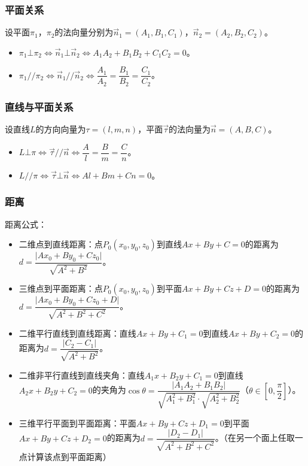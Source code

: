\subsubsection{平面关系}

设平面$\pi_1$，$\pi_2$的法向量分别为$\vec{n}_1=(A_1,B_1,C_1)$，$\vec{n}_2=(A_2,B_2,C_2)$。

\begin{itemize}
    \item $\pi_1\bot\pi_2\Leftrightarrow\vec{n}_1\bot\vec{n}_2\Leftrightarrow A_1A_2+B_1B_2+C_1C_2=0$。
    \item $\pi_1//\pi_2\Leftrightarrow\vec{n}_1//\vec{n}_2\Leftrightarrow\dfrac{A_1}{A_2}=\dfrac{B_1}{B_2}=\dfrac{C_1}{C_2}$。
\end{itemize}

\subsubsection{直线与平面关系}

设直线$L$的方向向量为$\tau=(l,m,n)$，平面$\vec{\tau}$的法向量为$\vec{n}=(A,B,C)$。

\begin{itemize}
    \item $L\bot\pi\Leftrightarrow\vec{\tau}//\vec{n}\Leftrightarrow\dfrac{A}{l}=\dfrac{B}{m}=\dfrac{C}{n}$。
    \item $L//\pi\Leftrightarrow\vec{\tau}\bot\vec{n}\Leftrightarrow Al+Bm+Cn=0$。
\end{itemize}

\subsubsection{距离}

距离公式：

\begin{itemize}
    \item 二维点到直线距离：点$P_0(x_0,y_0,z_0)$到直线$Ax+By+C=0$的距离为$d=\dfrac{\vert Ax_0+By_0+Cz_0\vert}{\sqrt{A^2+B^2}}$。
    \item 三维点到平面距离：点$P_0(x_0,y_0,z_0)$到平面$Ax+By+Cz+D=0$的距离为$d=\dfrac{\vert Ax_0+By_0+Cz_0+D\vert}{\sqrt{A^2+B^2+C^2}}$。
    \item 二维平行直线到直线距离：直线$Ax+By+C_1=0$到直线$Ax+By+C_2=0$的距离为$d=\dfrac{\vert C_2-C_1\vert}{\sqrt{A^2+B^2}}$。
    \item 二维非平行直线到直线夹角：直线$A_1x+B_2y+C_1=0$到直线$A_2x+B_2y+C_2=0$的夹角为$\cos\theta=\dfrac{\vert A_1A_2+B_1B_2\vert}{\sqrt{A_1^2+B_1^2}\cdot\sqrt{A_2^2+B_2^2}}$（$\theta\in\left[0,\dfrac{\pi}{2}\right]$）。
    \item 三维平行平面到平面距离：平面$Ax+By+Cz+D_1=0$到平面$Ax+By+Cz+D_2=0$的距离为$d=\dfrac{\vert D_2-D_1\vert}{\sqrt{A^2+B^2+C^2}}$。（在另一个面上任取一点计算该点到平面距离）
\end{itemize}

